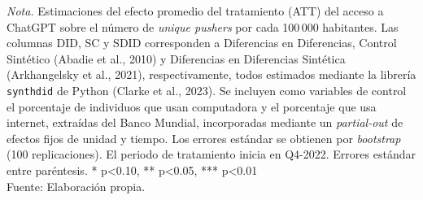 \begin{table}[htbp]
\begin{minipage}{\linewidth}
\smallskip\footnotesize\textit{Nota.} Estimaciones del efecto promedio del tratamiento (ATT) del acceso a ChatGPT sobre el n\'{u}mero de \textit{unique pushers} por cada 100\,000 habitantes. Las columnas DID, SC y SDID corresponden a Diferencias en Diferencias, Control Sint\'{e}tico (Abadie et al., 2010) y Diferencias en Diferencias Sint\'{e}tica (Arkhangelsky et al., 2021), respectivamente, todos estimados mediante la librer\'{i}a \texttt{synthdid} de Python (Clarke et al., 2023). Se incluyen como variables de control el porcentaje de individuos que usan computadora y el porcentaje que usa internet, extra\'{i}das del Banco Mundial, incorporadas mediante un \textit{partial-out} de efectos fijos de unidad y tiempo. Los errores est\'{a}ndar se obtienen por \textit{bootstrap} (100 replicaciones). El periodo de tratamiento inicia en Q4-2022. Errores est\'{a}ndar entre par\'{e}ntesis. * p<0.10, ** p<0.05, *** p<0.01\\[\baselineskip]Fuente: Elaboraci\'{o}n propia.
\end{minipage}
\end{table}
